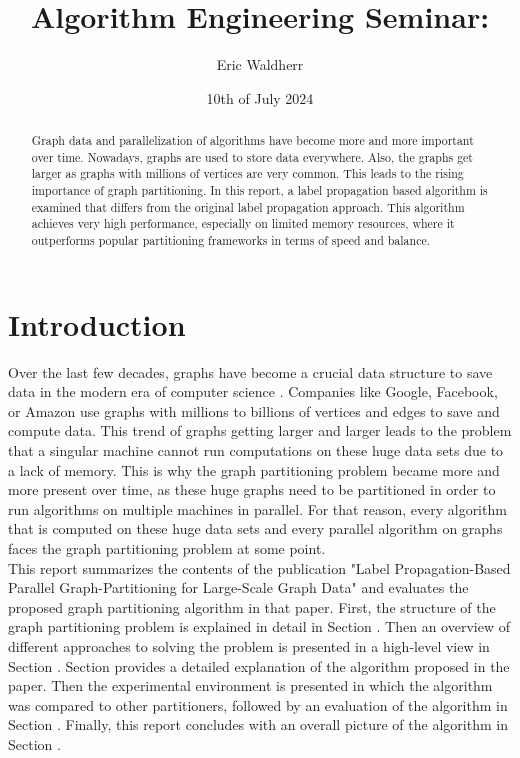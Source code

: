 \documentclass[acmsmall,nonacm,screen,review]{acmart}
\title{Algorithm Engineering Seminar: }
\author{Eric Waldherr}
\affiliation{%
  \institution{Heidelberg University}
  \streetaddress{Im Neuenheimer Feld 205}
  \city{Heidelberg}
  \state{Baden-Württemberg}
  \country{Germany}
  \postcode{69120}
}
\date{10th of July 2024}
\begin{document}
\begin{abstract}
Graph data and parallelization of algorithms have become more and more important over time. Nowadays, graphs are used to store data everywhere. Also, the graphs get larger as graphs with millions of vertices are very common. This leads to the rising importance of graph partitioning. In this report, a label propagation based algorithm is examined that differs from the original label propagation approach. This algorithm achieves very high performance, especially on limited memory resources, where it outperforms popular partitioning frameworks in terms of speed and balance.
\end{abstract}
\maketitle

\section{Introduction}
Over the last few decades, graphs have become a crucial data structure to save data in the modern era of computer science \cite{Junghanns2017}. Companies like Google, Facebook, or Amazon use graphs with millions to billions of vertices and edges to save and compute data. This trend of graphs getting larger and larger leads to the problem that a singular machine cannot run computations on these huge data sets due to a lack of memory. This is why the graph partitioning problem became more and more present over time, as these huge graphs need to be partitioned in order to run algorithms on multiple machines in parallel. For that reason, every algorithm that is computed on these huge data sets and every parallel algorithm on graphs faces the graph partitioning problem at some point. \\
This report summarizes the contents of the publication "Label Propagation-Based Parallel Graph-Partitioning for Large-Scale Graph Data" \cite{Main} and evaluates the proposed graph partitioning algorithm in that paper. First, the structure of the graph partitioning problem is explained in detail in Section . Then an overview of different approaches to solving the problem is presented in a high-level view in Section . Section  provides a detailed explanation of the algorithm proposed in the paper. Then the experimental environment is presented in which the algorithm was compared to other partitioners, followed by an evaluation of the algorithm in Section . Finally, this report concludes with an overall picture of the algorithm in Section .
\end{document}
